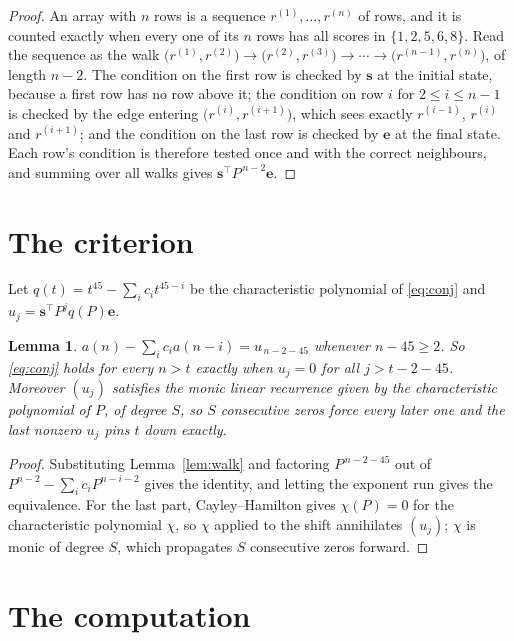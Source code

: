 \documentclass[11pt,a4paper]{article}
\theoremstyle{plain}
\newtheorem{lemma}[theorem]{Lemma}
\theoremstyle{definition}
\begin{document}
\begin{proof}
An array with $n$ rows is a sequence $r^{(1)},\dots,r^{(n)}$ of rows, and it is counted
exactly when every one of its $n$ rows has all scores in $\{1,2,5,6,8\}$. Read the sequence as the
walk $\bigl(r^{(1)},r^{(2)}\bigr)\to\bigl(r^{(2)},r^{(3)}\bigr)\to\cdots\to
\bigl(r^{(n-1)},r^{(n)}\bigr)$, of length $n-2$. The condition on the first row is
checked by $\mathbf{s}$ at the initial state, because a first row has no row above it; the
condition on row $i$ for $2\le i\le n-1$ is checked by the edge entering
$\bigl(r^{(i)},r^{(i+1)}\bigr)$, which sees exactly $r^{(i-1)}$, $r^{(i)}$ and
$r^{(i+1)}$; and the condition on the last row is checked by $\mathbf{e}$ at the final
state. Each row's condition is therefore tested once and with the correct neighbours, and
summing over all walks gives $\mathbf{s}^{\!\top}P^{\,n-2}\mathbf{e}$.
\end{proof}

\section{The criterion}

Let $q(t)=t^{45}-\sum_i c_i t^{45-i}$ be the characteristic polynomial of
\eqref{eq:conj} and $u_j=\mathbf{s}^{\!\top}P^{j}q(P)\mathbf{e}$.

\begin{lemma}\label{lem:crit}
$a(n)-\sum_i c_i a(n-i)=u_{\,n-2-45}$ whenever $n-45\ge2$. So \eqref{eq:conj}
holds for every $n>t$ exactly when $u_j=0$ for all $j>t-2-45$. Moreover $(u_j)$
satisfies the monic linear recurrence given by the characteristic polynomial of $P$, of
degree $S$, so $S$ consecutive zeros force every later one and the last nonzero $u_j$ pins
$t$ down exactly.
\end{lemma}

\begin{proof}
Substituting Lemma~\ref{lem:walk} and factoring $P^{\,n-2-45}$ out of
$P^{n-2}-\sum_i c_i P^{n-i-2}$ gives the identity, and letting the exponent run gives the
equivalence. For the last part, Cayley--Hamilton gives $\chi(P)=0$ for the characteristic
polynomial $\chi$, so $\chi$ applied to the shift annihilates $(u_j)$; $\chi$ is monic of
degree $S$, which propagates $S$ consecutive zeros forward.
\end{proof}

\section{The computation}
\end{document}
